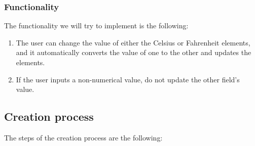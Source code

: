 \subsubsection{Functionality}
The functionality we will try to implement is the following:
\begin{enumerate}
	\item The user can change the value of either the Celsius or Fahrenheit elements, and it automatically converts the value of one to the other and updates the elements.
	\item If the user inputs a non-numerical value, do not update the other field's value.
\end{enumerate}
\medskip
\subsection {Creation process}
The steps of the creation process are the following:
